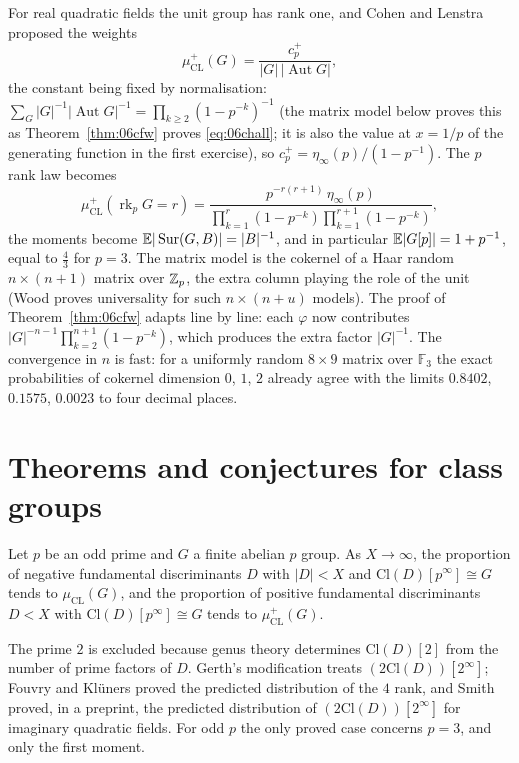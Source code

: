 For real quadratic fields the unit group has rank one, and Cohen and Lenstra proposed the weights
\[
\mu^+_{\mathrm{CL}}(G) = \frac{c_p^+}{|G|\,|\operatorname{Aut}G|},
\]
the constant being fixed by normalisation: $\sum_G|G|^{-1}|\operatorname{Aut}G|^{-1} = \prod_{k\ge2}(1-p^{-k})^{-1}$ (the matrix model below proves this as Theorem~\ref{thm:06cfw} proves \eqref{eq:06chall}; it is also the value at $x = 1/p$ of the generating function in the first exercise), so $c_p^+ = \eta_\infty(p)/(1-p^{-1})$. The $p$ rank law becomes
\[
\mu^+_{\mathrm{CL}}(\operatorname{rk}_pG = r) = \frac{p^{-r(r+1)}\,\eta_\infty(p)}{\prod_{k=1}^r(1-p^{-k})\prod_{k=1}^{r+1}(1-p^{-k})},
\]
the moments become $\mathbb{E}|\operatorname{Sur}(G,B)| = |B|^{-1}$, and in particular $\mathbb{E}|G[p]| = 1+p^{-1}$, equal to $\frac43$ for $p=3$. The matrix model is the cokernel of a Haar random $n\times(n+1)$ matrix over $\mathbb{Z}_p$, the extra column playing the role of the unit (Wood \cite{wood2019} proves universality for such $n\times(n+u)$ models). The proof of Theorem~\ref{thm:06cfw} adapts line by line: each $\varphi$ now contributes $|G|^{-n-1}\prod_{k=2}^{n+1}(1-p^{-k})$, which produces the extra factor $|G|^{-1}$. The convergence in $n$ is fast: for a uniformly random $8\times9$ matrix over $\mathbb{F}_3$ the exact probabilities of cokernel dimension $0$, $1$, $2$ already agree with the limits $0.8402$, $0.1575$, $0.0023$ to four decimal places.

\section{Theorems and conjectures for class groups}\label{sec:06ctheorems}

\begin{conjecture}\label{conj:06ccl}
Let $p$ be an odd prime and $G$ a finite abelian $p$ group. As $X\to\infty$, the proportion of negative fundamental discriminants $D$ with $|D|<X$ and $\mathrm{Cl}(D)[p^\infty]\cong G$ tends to $\mu_{\mathrm{CL}}(G)$, and the proportion of positive fundamental discriminants $D<X$ with $\mathrm{Cl}(D)[p^\infty]\cong G$ tends to $\mu^+_{\mathrm{CL}}(G)$.
\end{conjecture}

The prime $2$ is excluded because genus theory determines $\mathrm{Cl}(D)[2]$ from the number of prime factors of $D$. Gerth's modification treats $(2\mathrm{Cl}(D))[2^\infty]$; Fouvry and Kl\"uners \cite{fouvrykluners2007} proved the predicted distribution of the $4$ rank, and Smith \cite{smith2017} proved, in a preprint, the predicted distribution of $(2\mathrm{Cl}(D))[2^\infty]$ for imaginary quadratic fields. For odd $p$ the only proved case concerns $p = 3$, and only the first moment.

